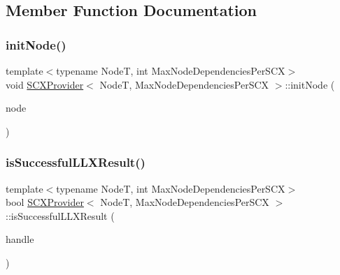 \subsection{Member Function Documentation}
\mbox{\label{classSCXProvider_ad68b83e76f7aa9d6d1abaa5e93f1ca72}} 
\subsubsection{\texorpdfstring{init\+Node()}{initNode()}}
{\footnotesize\ttfamily template$<$typename NodeT, int Max\+Node\+Dependencies\+Per\+S\+CX$>$ \\
void \hyperlink{classSCXProvider}{S\+C\+X\+Provider}$<$ NodeT, Max\+Node\+Dependencies\+Per\+S\+CX $>$\+::init\+Node (\begin{DoxyParamCaption}\item[{NodeT $\ast$const}]{node }\end{DoxyParamCaption})\hspace{0.3cm}{\ttfamily [inline]}}

\mbox{\label{classSCXProvider_a49b1076e1a2b4e7af32bc298a1c7a438}} 
\subsubsection{\texorpdfstring{is\+Successful\+L\+L\+X\+Result()}{isSuccessfulLLXResult()}}
{\footnotesize\ttfamily template$<$typename NodeT, int Max\+Node\+Dependencies\+Per\+S\+CX$>$ \\
bool \hyperlink{classSCXProvider}{S\+C\+X\+Provider}$<$ NodeT, Max\+Node\+Dependencies\+Per\+S\+CX $>$\+::is\+Successful\+L\+L\+X\+Result (\begin{DoxyParamCaption}\item[{\hyperlink{scx__provider_8h_a368fa55a4b553010913289d3cbe6ce22}{scx\+\_\+handle\+\_\+t} const}]{handle }\end{DoxyParamCaption})\hspace{0.3cm}{\ttfamily [inline]}}

\mbox{\label{classSCXProvider_aa521eed22367f99ada4acba67e6f3f89}} 
